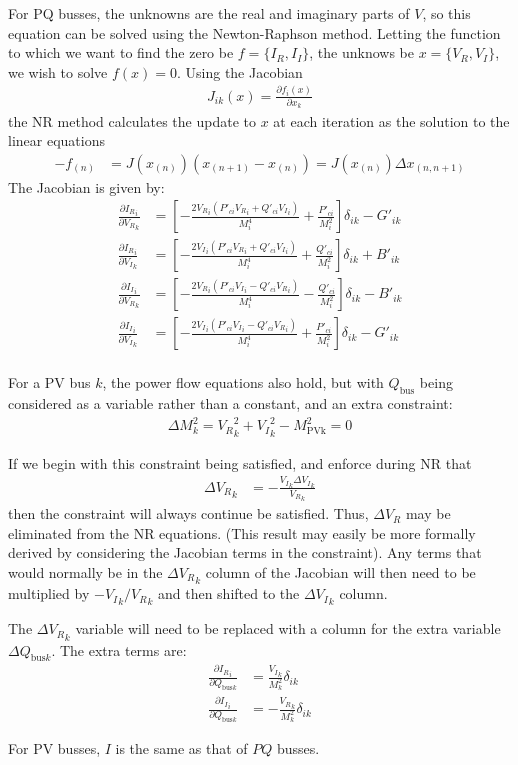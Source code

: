 \documentclass[11pt]{article}
\newcommand{\re}[1]{{{#1}_R}}
\newcommand{\im}[1]{{{#1}_I}}
\begin{document}
For PQ busses, the unknowns are the real and imaginary parts of $V$, so this equation can be solved using the Newton-Raphson method. Letting the function to which we want to find the zero be $f = \{\re{I}, \im{I}\}$, the unknows be $x = \{\re{V}, \im{V}\}$, we wish to solve $f(x) = 0$. Using the Jacobian
\begin{align}
J_{ik}(x) = \frac{\partial f_i(x)}{\partial x_k}
\end{align}
the NR method calculates the update to $x$ at each iteration as the solution to the linear equations
\begin{align}
-f_{(n)} &= J(x_{(n)})(x_{(n+1)}-x_{(n)}) = J(x_{(n)})\Delta x_{(n,n+1)}
\end{align}
The Jacobian is given by:
\begin{align}
\frac{\partial \re{I}_i}{\partial \re{V}_{k}} &= \left[-\frac{2\re{V}_i(P'_{ci}\re{V}_i + Q'_{ci}\im{V}_i)}{M_i^4} + \frac{P'_{ci}}{M_i^2} \right]\delta_{ik} - G'_{ik} \\
\frac{\partial \re{I}_i}{\partial \im{V}_{k}} &= \left[-\frac{2\im{V}_i(P'_{ci}\re{V}_i + Q'_{ci}\im{V}_i)}{M_i^4} + \frac{Q'_{ci}}{M_i^2} \right]\delta_{ik}  + B'_{ik} \\
\frac{\partial \im{I}_i}{\partial \re{V}_{k}} &= \left[-\frac{2\re{V}_i(P'_{ci}\im{V}_i - Q'_{ci}\re{V}_i)}{M_i^4} - \frac{Q'_{ci}}{M_i^2} \right]\delta_{ik}  - B'_{ik} \\
\frac{\partial \im{I}_i}{\partial \im{V}_{k}} &= \left[-\frac{2\im{V}_i(P'_{ci}\im{V}_i - Q'_{ci}\re{V}_i)}{M_i^4} + \frac{P'_{ci}}{M_i^2} \right] \delta_{ik} - G'_{ik} \\
\end{align}

For a PV bus $k$, the power flow equations also hold, but with $Q_{\text{bus}}$ being considered as a variable rather than a constant, and an extra constraint:
\begin{align}
\Delta M^2_k = \re{V}_{k}^2 + \im{V}_k^2 - M^2_{\text{PVk}} = 0
\end{align}

If we begin with this constraint being satisfied, and enforce during NR that
\begin{align}
\re{\Delta V}_k &= -\frac{\im{V}_k\im{\Delta V}_k}{\re{V}_k}
\end{align}
then the constraint will always continue be satisfied. Thus, $\re{\Delta V}$ may be eliminated from the NR equations. (This result may easily be more formally derived by considering the Jacobian terms in the constraint). Any terms that would normally be in the $\re{\Delta V}_k$ column of the Jacobian will then need to be multiplied by $-\im{V}_k/\re{V}_k$ and then shifted to the $\im{\Delta V}_k$ column.

The $\re{\Delta V}_k$ variable will need to be replaced with a column for the extra variable $\Delta Q_{\text{bus}k}$.  The extra terms are:
\begin{align}
\frac{\partial \re{I}_i}{\partial Q_{\text{bus}k}} &= \frac{\im{V}_k}{M_k^2}\delta_{ik} \\
\frac{\partial \im{I}_i}{\partial Q_{\text{bus}k}} &= -\frac{\re{V}_k}{M_k^2}\delta_{ik}
\end{align}

For PV busses, $I$ is the same as that of $PQ$ busses.
\end{document}
